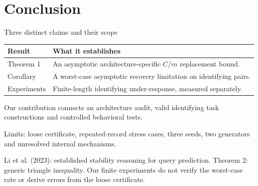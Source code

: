 \documentclass[aspectratio=169,11pt]{beamer}
\newcommand{\source}[1]{\par\vfill{\color{muted}\tiny #1}}
\begin{document}
\section{Conclusion}
\begin{frame}{Three distinct claims and their scope}
\begin{tabular}{p{}p{}}
\toprule
Result & What it establishes\\
\midrule
Theorem 1 & An asymptotic architecture-specific \(C/m\) replacement bound.\\[2mm]
Corollary & A worst-case asymptotic recovery limitation on identifying pairs.\\[2mm]
Experiments & Finite-length identifying under-response, measured separately.\\
\bottomrule
\end{tabular}
\par\vspace{4mm}
\small Our contribution connects an architecture audit, valid identifying
task constructions and controlled behavioral tests.
\vspace{2mm}

\small Limits: loose certificate, repeated-record stress cases, three seeds,
two generators and unresolved internal mechanisms.
\source{Li et al. (2023): established stability reasoning for query prediction.
Theorem 2: generic triangle inequality. Our finite experiments do not verify
the worst-case rate or derive errors from the loose certificate.}
\end{frame}
\end{document}
